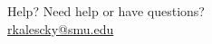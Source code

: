 \begin{frame}{Help?}
\centering
Need help or have questions?\\
\href{mailto:rkalescky@smu.edu}{rkalescky@smu.edu}
\end{frame}

